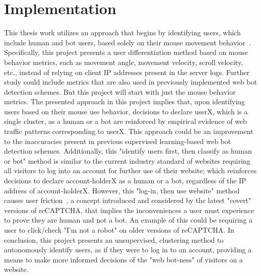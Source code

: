 ﻿
\chapter{Implementation}\label{ch:implementation}
This thesis work utilizes an approach that begins by identifying users, which include human and bot users, based solely on their mouse movement behavior~\cite{intrustion_detection_using_mouse_dynamics}.
Specifically, this project presents a user differentiation method based on mouse behavior metrics, such as movement angle, movement velocity, scroll velocity, etc., instead of relying on client IP addresses present in the server logs.
Further study could include metrics that are also used in previously implemented web bot detection schemes.
But this project will start with just the mouse behavior metrics.
The presented approach in this project implies that, upon identifying users based on their mouse use behavior, decisions to declare userX, which is a single cluster, as a human or a bot are reinforced by empirical evidence of web traffic patterns corresponding to userX.
This approach could be an improvement to the inaccuracies present in previous supervised learning-based web bot detection schemes.
Additionally, this "identify users first, then classify as human or bot" method is similar to the current industry standard of websites requiring all visitors to log into an account for further use of their website; which reinforces decisions to declare account-holderX as a human or a bot, regardless of the IP address of account-holderX.
However, this "log-in, then use website" method causes user friction~\cite{how_recaptcha_is_improving_user_experience}, a concept introduced and considered by the latest "covert" versions of reCAPTCHA, that implies the inconveniences a user must experience to prove they are human and not a bot.
An example of this could be requiring a user to click/check "I'm not a robot" on older versions of reCAPTCHA.
In conclusion, this project presents an unsupervised, clustering method to autonomously identify users, as if they were to log in to an account, providing a means to make more informed decisions of the "web bot-ness" of visitors on a website.












